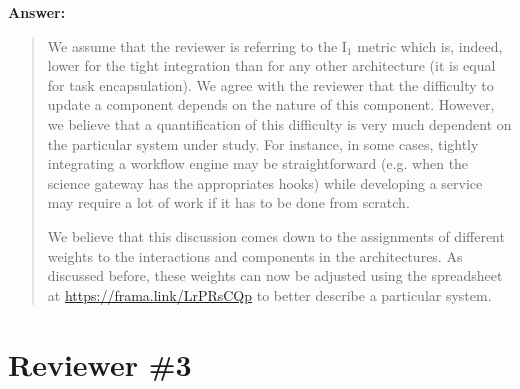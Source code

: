 \documentclass[a4]{article}
\newenvironment{answer}%
{\textbf{Answer:}\begin{small}\begin{quote}}%
{\end{quote}\end{small}}%
\begin{document}
\begin{answer}
  We assume that the reviewer is referring to the I$_1$ metric which
  is, indeed, lower for the tight integration than for any other
  architecture (it is equal for task encapsulation). We agree with the
  reviewer that the difficulty to update a component depends on the
  nature of this component. However, we believe that a quantification
  of this difficulty is very much dependent on the particular system
  under study. For instance, in some cases, tightly integrating a
  workflow engine may be straightforward (e.g. when the science
  gateway has the appropriates hooks) while developing a service may
  require a lot of work if it has to be done from scratch.

  We believe that this discussion comes down to the assignments of
  different weights to the interactions and components in the
  architectures. As discussed before, these weights can now be
  adjusted using the spreadsheet at \url{https://frama.link/LrPRsCQp}
  to better describe a particular system.
\end{answer}

\section{Reviewer \#3}
\end{document}

